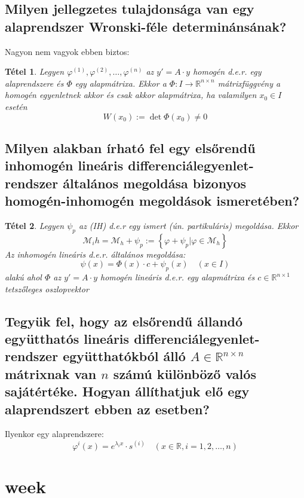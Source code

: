 \documentclass[12pt,a4paper]{article}
\newcommand{\R}{\mathbb{R}}
\newcommand{\CM}{\mathcal{M}}
\newcommand{\f}{\varphi}
\newcommand{\bb}[1]{\left( #1 \right)}
\newcommand{\braces}[1]{\left\lbrace #1 \right\rbrace}
\newtheorem{tet}{Tétel}[section]
\begin{document}
\subsection{Milyen jellegzetes tulajdonsága van egy alaprendszer Wronski-féle determinánsának?}
Nagyon nem vagyok ebben biztos:
\begin{tet}
Legyen $\f^{(1)},\f^{(2)},\ldots,\f^{(n)}$ az $y' = A \cdot y$ homogén d.e.r. egy alaprendszere és $\Phi$ egy alapmátrixa. Ekkor a $\Phi : I \to \R^{n \times n}$ mátrixfüggvény a homogén egyenletnek akkor és csak akkor alapmátrixa, ha valamilyen $x_0 \in I $ esetén 
\[
W(x_0) := \det \Phi(x_0) \neq 0
\]
\end{tet}
\subsection{Milyen alakban írható fel egy elsőrendű inhomogén lineáris differenciálegyenlet-rendszer általános megoldása bizonyos homogén-inhomogén megoldások ismeretében?}
\begin{tet}
Legyen $\psi_p$ az (IH) d.e.r egy ismert (ún. partikuláris) megoldása. Ekkor
\[
\CM_ih = \CM_h + \psi_p := \braces{\f + \psi_p \lvert \f \in \CM_h}
\]
Az inhomogén lineáris d.e.r. általános megoldása:
\[
\psi(x) = \Phi(x) \cdot c + \psi_p(x) \quad \bb{x \in I}
\]
alakú ahol $\Phi$ az $y' = A \cdot y$ homogén lineáris d.e.r. egy alapmátrixa és $c \in \R^{n \times 1 }$ tetszőleges oszlopvektor
\end{tet}

\subsection{Tegyük fel, hogy az elsőrendű állandó együtthatós lineáris differenciálegyenlet-rendszer együtthatókból álló $A \in \R^{n \times n}$ mátrixnak van $n$ számú különböző valós sajátértéke. Hogyan állíthatjuk elő egy alaprendszert ebben az esetben?}
Ilyenkor egy alaprendszere:
\[
\f^{i}(x) = e^{\lambda_{i}x} \cdot s^{(i)} \quad \bb{x \in \R, i = 1,2, \ldots, n}
\]
\newpage
\section{week}
\end{document}
